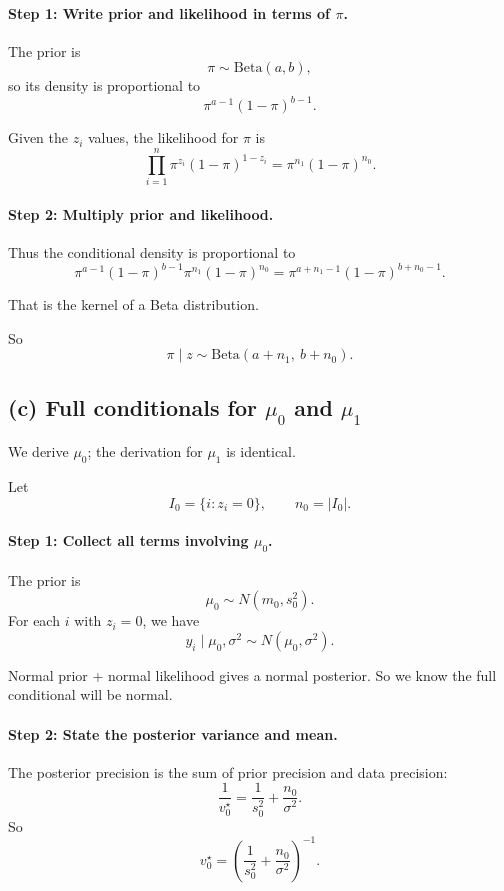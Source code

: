 \documentclass[11pt]{article}
\begin{document}
\paragraph{Step 1: Write prior and likelihood in terms of $\pi$.}

The prior is
\[
\pi\sim \text{Beta}(a,b),
\]
so its density is proportional to
\[
\pi^{a-1}(1-\pi)^{b-1}.
\]

Given the $z_i$ values, the likelihood for $\pi$ is
\[
\prod_{i=1}^n \pi^{z_i}(1-\pi)^{1-z_i}
=
\pi^{n_1}(1-\pi)^{n_0}.
\]

\paragraph{Step 2: Multiply prior and likelihood.}

Thus the conditional density is proportional to
\[
\pi^{a-1}(1-\pi)^{b-1}\pi^{n_1}(1-\pi)^{n_0}
=
\pi^{a+n_1-1}(1-\pi)^{b+n_0-1}.
\]

That is the kernel of a Beta distribution.

So
\[
\boxed{
\pi\mid z \sim \text{Beta}(a+n_1,\ b+n_0).
}
\]

\subsection*{(c) Full conditionals for $\mu_0$ and $\mu_1$}

We derive $\mu_0$; the derivation for $\mu_1$ is identical.

Let
\[
I_0=\{i:z_i=0\},
\qquad
n_0=|I_0|.
\]

\paragraph{Step 1: Collect all terms involving $\mu_0$.}

The prior is
\[
\mu_0\sim N(m_0,s_0^2).
\]
For each $i$ with $z_i=0$, we have
\[
y_i\mid \mu_0,\sigma^2 \sim N(\mu_0,\sigma^2).
\]

Normal prior + normal likelihood gives a normal posterior.
So we know the full conditional will be normal.

\paragraph{Step 2: State the posterior variance and mean.}

The posterior precision is the sum of prior precision and data precision:
\[
\frac{1}{v_0^\star}
=
\frac{1}{s_0^2}
+
\frac{n_0}{\sigma^2}.
\]
So
\[
v_0^\star
=
\left(
\frac{1}{s_0^2}
+
\frac{n_0}{\sigma^2}
\right)^{-1}.
\]
\end{document}
